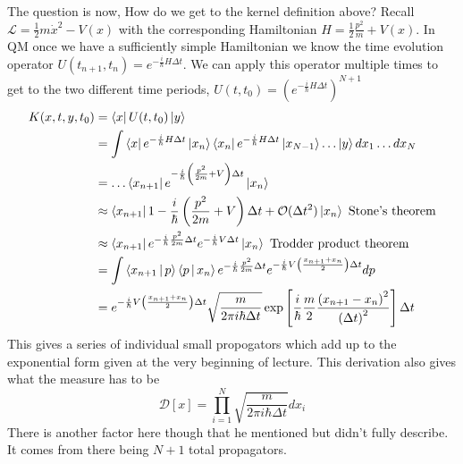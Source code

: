 The question is now, How do we get to the kernel definition above? Recall
$\mathcal{L} = \frac{1}{2} m \dot{x}^2 - V(x)$ with the corresponding
Hamiltonian $H = \frac{1}{2} \frac{p^2}{m} + V(x)$. In QM once we have a
sufficiently simple Hamiltonian we know the time evolution operator
$U(t_{n+1}, t_n) = e^{-\frac{i}{\hbar} H \Delta t}$. We can apply this
operator multiple times to get to the two different time periods,
$U(t, t_0) = \left(e^{-\frac{i}{\hbar} H \Delta t}\right)^{N+1}$
\begin{align*}
    K(x, t, y, t_0) 
    &= \Bra{x} U(t, t_0) \Ket{y} \\
    &= \int \Bra{x} e^{-\frac{i}{\hbar} H \Delta t} \Ket{x_n}
        \Bra{x_n} e^{-\frac{i}{\hbar} H \Delta t} \Ket{x_{N-1}} \dots
        \Ket{y} dx_1 \dots dx_N \\
    &= \dots \Bra{x_{n+1}} e^{-\frac{i}{\hbar} \left(\frac{p^2}{2m} + V\right) \Delta t}
        \Ket{x_n} \\
    &\approx
        \Bra{x_{n+1}} 1 - \frac{i}{\hbar} \left(\frac{p^2}{2m} + V\right) \Delta t +
        \mathcal{O}(\Delta t^2) \Ket{x_n} \text{ Stone's theorem}\\
    &\approx
        \Bra{x_{n+1}} e^{-\frac{i}{\hbar} \frac{p^2}{2m} \Delta t}
        e^{-\frac{i}{\hbar} V \Delta t} \Ket{x_n} \text{ Trodder product theorem} \\
    &= \int \Braket{x_{n+1} | p} \Braket{p | x_n}
        e^{-\frac{i}{\hbar} \frac{p^2}{2m} \Delta t}
        e^{-\frac{i}{\hbar} V \left(\frac{x_{n+1} + x_n}{2}\right) \Delta t}
        dp \\
    &=  e^{-\frac{i}{\hbar} V \left(\frac{x_{n+1} + x_n}{2}\right) \Delta t}
        \sqrt{\frac{m}{2 \pi i \hbar \Delta t}} \exp \left[
            \frac{i}{\hbar} \frac{m}{2} 
            \frac{\left(x_{n+1} - x_n\right)^2}{\left(\Delta t\right)^2}
        \right] \Delta t
\end{align*}
This gives a series of individual small propogators which add up to the exponential form
given at the very beginning of lecture. This derivation also gives what the measure has to be
$$
    \mathcal{D}\left[x\right] = \prod_{i=1}^{N} 
    \sqrt{\frac{m}{2 \pi i \hbar \Delta t}} dx_i
$$
There is another factor here though that he mentioned but didn't fully describe. It comes from
there being $N+1$ total propagators.

